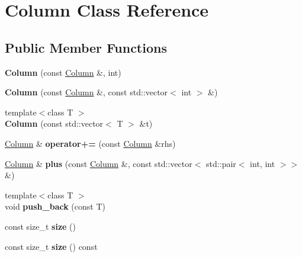 \hypertarget{classColumn}{}\section{Column Class Reference}
\label{classColumn}
\subsection*{Public Member Functions}
\begin{DoxyCompactItemize}
\item 
\mbox{\label{classColumn_afee1bd02472d645138336b4a0e163415}} 
{\bfseries Column} (const \hyperlink{classColumn}{Column} \&, int)
\item 
\mbox{\label{classColumn_a10196a56bf17147b81a40aac7eda70f8}} 
{\bfseries Column} (const \hyperlink{classColumn}{Column} \&, const std\+::vector$<$ int $>$ \&)
\item 
\mbox{\label{classColumn_ab9bd37fa800223b400c0a1158ca244e1}} 
{\footnotesize template$<$class T $>$ }\\{\bfseries Column} (const std\+::vector$<$ T $>$ \&t)
\item 
\mbox{\label{classColumn_ac829a2f0d773411aec014d1a36abaeec}} 
\hyperlink{classColumn}{Column} \& {\bfseries operator+=} (const \hyperlink{classColumn}{Column} \&rhs)
\item 
\mbox{\label{classColumn_af4232d458c38e5a2c5a75c660664e105}} 
\hyperlink{classColumn}{Column} \& {\bfseries plus} (const \hyperlink{classColumn}{Column} \&, const std\+::vector$<$ std\+::pair$<$ int, int $>$$>$ \&)
\item 
\mbox{\label{classColumn_a9f7b60a5645dd0b604922ad10f0a4528}} 
{\footnotesize template$<$class T $>$ }\\void {\bfseries push\+\_\+back} (const T)
\item 
\mbox{\label{classColumn_a7e685e54c2019625b9be74cb756400df}} 
const size\+\_\+t {\bfseries size} ()
\item 
\mbox{\label{classColumn_a2845358ab681986b3f2c17f91961657e}} 
const size\+\_\+t {\bfseries size} () const
$$
\end{DoxyCompactItemize}
